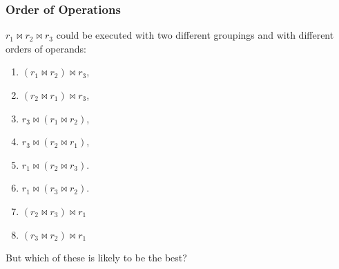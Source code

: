 \begin{frame}
\frametitle{Order of Operations}

$r_{1} \bowtie r_{2} \bowtie r_{3}$ could be executed with two different groupings and with different orders of operands: 


\begin{enumerate}
\item $(r_{1} \bowtie r_{2}) \bowtie r_{3}$,  
\item $(r_{2} \bowtie r_{1}) \bowtie r_{3}$, 
\item $r_{3} \bowtie (r_{1} \bowtie r_{2})$,
\item $r_{3} \bowtie (r_{2} \bowtie r_{1})$,
\item $r_{1} \bowtie (r_{2} \bowtie r_{3})$. 
\item $r_{1} \bowtie (r_{3} \bowtie r_{2})$. 
\item $(r_{2} \bowtie r_{3}) \bowtie r_{1}$
\item $(r_{3} \bowtie r_{2}) \bowtie r_{1}$
\end{enumerate}

But which of these is likely to be the best?

\end{frame}





